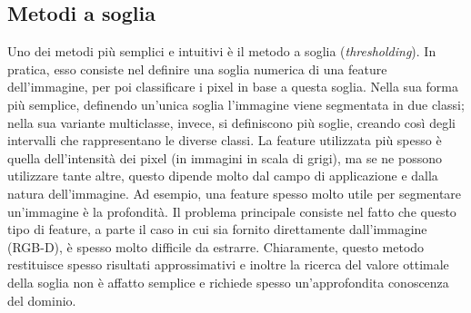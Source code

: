 \subsection{Metodi a soglia}
\label{metodi_soglia}
Uno dei metodi più semplici e intuitivi è il metodo a soglia (\textit{thresholding}). In pratica, esso consiste nel definire una soglia numerica di una feature dell'immagine, per poi classificare i pixel in base a questa soglia. Nella sua forma più semplice, definendo un'unica soglia l'immagine viene segmentata in due classi; nella sua variante multiclasse, invece, si definiscono più soglie, creando così degli intervalli che rappresentano le diverse classi. La feature utilizzata più spesso è quella dell'intensità dei pixel (in immagini in scala di grigi), ma se ne possono utilizzare tante altre, questo dipende molto dal campo di applicazione e dalla natura dell'immagine. Ad esempio, una feature spesso molto utile per segmentare un'immagine è la profondità. Il problema principale consiste nel fatto che questo tipo di feature, a parte il caso in cui sia fornito direttamente dall'immagine (RGB-D), è spesso molto difficile da estrarre.
Chiaramente, questo metodo restituisce spesso risultati approssimativi e inoltre la ricerca del valore ottimale della soglia non è affatto semplice e richiede spesso un'approfondita conoscenza del dominio.





